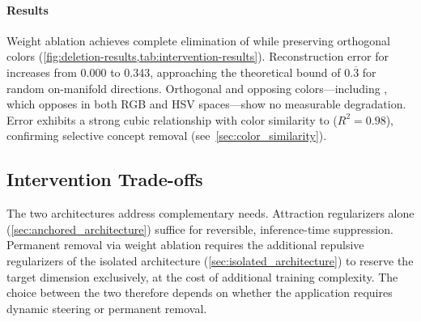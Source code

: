 %

\paragraph{Results}
Weight ablation achieves complete elimination of  while preserving orthogonal colors (\cref{fig:deletion-results,tab:intervention-results}). Reconstruction error for  increases from 0.000 to 0.343, approaching the theoretical bound of $0.\overline{3}$ for random on-manifold directions. Orthogonal and opposing colors---including , which opposes  in both RGB and HSV spaces---show no measurable degradation. Error exhibits a strong cubic relationship with color similarity to  ($R^2 = 0.98$), confirming selective concept removal (see~\cref{sec:color_similarity}).

\subsection{Intervention Trade-offs}
\label{sec:intervention_tradeoffs}

The two architectures address complementary needs. Attraction regularizers alone (\cref{sec:anchored_architecture}) suffice for reversible, inference-time suppression. Permanent removal via weight ablation requires the additional repulsive regularizers of the isolated architecture (\cref{sec:isolated_architecture}) to reserve the target dimension exclusively, at the cost of additional training complexity. The choice between the two therefore depends on whether the application requires dynamic steering or permanent removal.
